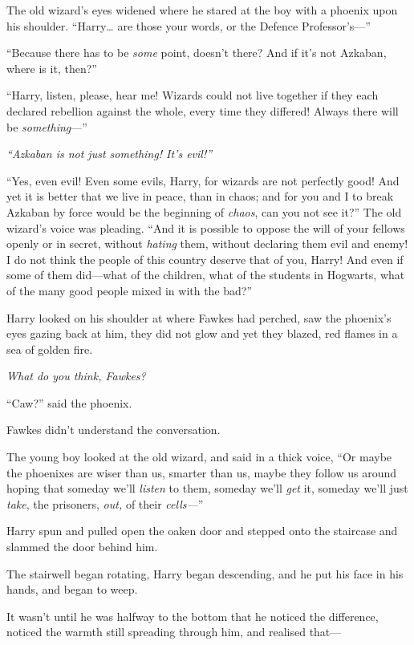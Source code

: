 The old wizard's eyes widened where he stared at the boy with a phoenix
upon his shoulder. ``Harry\ldots{} are those your words, or the Defence
Professor's---''

``Because there has to be \emph{some} point, doesn't there? And if it's
not Azkaban, where is it, then?''

``Harry, listen, please, hear me! Wizards could not live together if
they each declared rebellion against the whole, every time they
differed! Always there will be \emph{something}---''

\emph{``Azkaban is not just something! It's evil!''}

``Yes, even evil! Even some evils, Harry, for wizards are not perfectly
good! And yet it is better that we live in peace, than in chaos; and for
you and I to break Azkaban by force would be the beginning of
\emph{chaos}, can you not see it?'' The old wizard's voice was pleading.
``And it is possible to oppose the will of your fellows openly or in
secret, without \emph{hating} them, without declaring them evil and
enemy! I do not think the people of this country deserve that of you,
Harry! And even if some of them did---what of the children, what of the
students in Hogwarts, what of the many good people mixed in with the
bad?''

Harry looked on his shoulder at where Fawkes had perched, saw the
phoenix's eyes gazing back at him, they did not glow and yet they
blazed, red flames in a sea of golden fire.

\emph{What do you think, Fawkes?}

``Caw?'' said the phoenix.

Fawkes didn't understand the conversation.

The young boy looked at the old wizard, and said in a thick voice, ``Or
maybe the phoenixes are wiser than us, smarter than us, maybe they
follow us around hoping that someday we'll \emph{listen} to them,
someday we'll \emph{get} it, someday we'll just \emph{take}, the
prisoners, \emph{out,} of their \emph{cells---}''

Harry spun and pulled open the oaken door and stepped onto the staircase
and slammed the door behind him.

The stairwell began rotating, Harry began descending, and he put his
face in his hands, and began to weep.

It wasn't until he was halfway to the bottom that he noticed the
difference, noticed the warmth still spreading through him, and realised
that---

